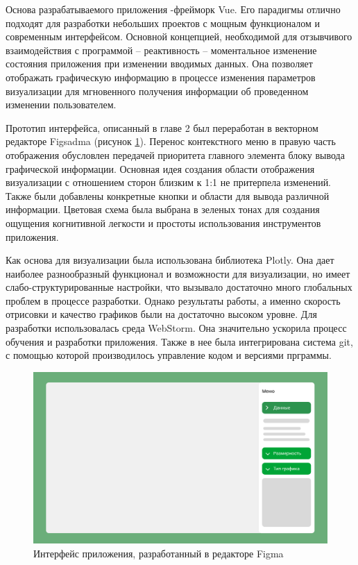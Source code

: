 Основа разрабатываемого приложения -фрейморк Vue. Его парадигмы отлично подходят для разработки небольших проектов с мощным функционалом и современным интерфейсом. Основной концепцией, необходимой для отзывчивого взаимодействия с программой -- реактивность -- моментальное изменение состояния приложения при изменении вводимых данных. Она позволяет отображать графическую информацию в процессе изменения параметров визуализации для мгновенного получения информации об проведенном изменении пользователем.


Прототип интерфейса, описанный в главе 2 был переработан в векторном редакторе Figsadma (рисунок \ref{fig:11}). Перенос контекстного меню в правую часть отображения обусловлен передачей приоритета главного элемента блоку вывода графической информации. Основная идея создания области отображения визуализации с отношением сторон близким к 1:1 не притерпела изменений.
Также были добавлены конкретные кнопки и области для вывода различной информации. Цветовая схема была выбрана в зеленых тонах для создания ощущения когнитивной легкости и простоты использования инструментов приложения.



Как основа для визуализации была использована библиотека Plotly. Она дает наиболее разнообразный функционал и возможности для визуализации, но имеет слабо-структурированные настройки, что вызывало достаточно много глобальных проблем в процессе разработки. Однако результаты работы, а именно скорость отрисовки и качество графиков были на достаточно высоком уровне.
Для разработки использовалась среда WebStorm. Она значительно ускорила процесс обучения и разработки приложения. Также в нее была интегрирована система git, с помощью которой производилось управление кодом и версиями прграммы.

\begin{figure}[h!]
    \center
    \includegraphics[scale=0.5]{fig/Figma.png}
    \caption{Интерфейс приложения, разработанный в редакторе Figma}
    \label{fig:11}
\end{figure}

